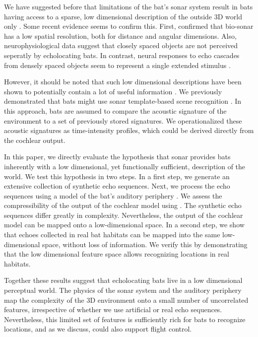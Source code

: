 \documentclass[preprint,5p]{elsarticle}
\begin{document}
We have suggested before that limitations of the bat's sonar system result in bats having access to a sparse, low dimensional description of the outside 3D world only \citep{Vanderelst2015a,Vanderelst2016}. Some recent evidence seems to confirm this. First, \citet{Geberl2019} confirmed that bio-sonar has a low spatial resolution, both for distance and angular dimensions. Also, neurophysiological data suggest that closely spaced objects are not perceived seperatly by echolocating bats. In contrast, neural responses to echo cascades from densely spaced objects seem to represent a single extended stimulus \citep{Warnecke2018,Knowles2015}.

However, it should be noted that such low dimensional descriptions have been shown to potentially contain a lot of useful information \citep{Kuc1997b,Kuc1997}. We previously demonstrated that bats might use sonar template-based scene recognition \citep{Vanderelst2016,Vanderelst2017}. In this approach, bats are assumed to compare the acoustic signature of the environment to a set of previously stored signatures. We operationalized these acoustic signatures as time-intensity profiles, which could be derived directly from the cochlear output.

In this paper, we directly evaluate the hypothesis that sonar provides bats inherently with a low dimensional, yet functionally sufficient, description of the world. We test this hypothesis in two steps. In a first step, we generate an extensive collection of synthetic echo sequences. Next, we process the echo sequences using a model of the bat's auditory periphery \citep{Wiegrebe2008}. We assess the compressibility of the output of the cochlear model using \PCA. The synthetic echo sequences differ greatly in complexity. Nevertheless, the output of the cochlear model can be mapped onto a low-dimensional space. In a second step, we show that echoes collected in real bat habitats can be mapped into the same low-dimensional space, without loss of information. We verify this by demonstrating that the low dimensional feature space allows recognizing locations in real habitats. 

Together these results suggest that echolocating bats live in a low dimensional perceptual world. The physics of the sonar system and the auditory periphery map the complexity of the 3D environment onto a small number of uncorrelated features, irrespective of whether we use artificial or real echo sequences. Nevertheless, this limited set of features is sufficiently rich for bats to recognize locations, and as we discuss, could also support flight control.
\end{document}
